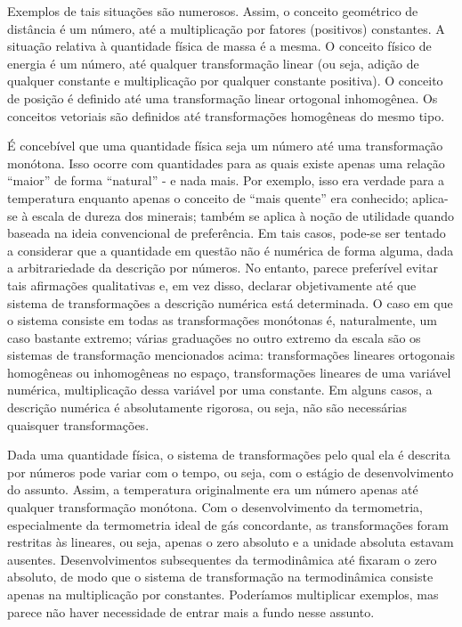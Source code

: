 \documentclass[12pt]{article}
\begin{document}
Exemplos de tais situações são numerosos. Assim, o conceito geométrico de distância é um número, até a multiplicação por fatores (positivos) constantes. A situação relativa à quantidade física de massa é a mesma. O conceito físico de energia é um número, até qualquer transformação linear (ou seja, adição de qualquer constante e multiplicação por qualquer constante positiva). O conceito de posição é definido até uma transformação linear ortogonal inhomogênea. Os conceitos vetoriais são definidos até transformações homogêneas do mesmo tipo.

É concebível que uma quantidade física seja um número até uma transformação monótona. Isso ocorre com quantidades para as quais existe apenas uma relação “maior” de forma “natural” - e nada mais. Por exemplo, isso era verdade para a temperatura enquanto apenas o conceito de “mais quente” era conhecido; aplica-se à escala de dureza dos minerais; também se aplica à noção de utilidade quando baseada na ideia convencional de preferência. Em tais casos, pode-se ser tentado a considerar que a quantidade em questão não é numérica de forma alguma, dada a arbitrariedade da descrição por números. No entanto, parece preferível evitar tais afirmações qualitativas e, em vez disso, declarar objetivamente até que sistema de transformações a descrição numérica está determinada. O caso em que o sistema consiste em todas as transformações monótonas é, naturalmente, um caso bastante extremo; várias graduações no outro extremo da escala são os sistemas de transformação mencionados acima: transformações lineares ortogonais homogêneas ou inhomogêneas no espaço, transformações lineares de uma variável numérica, multiplicação dessa variável por uma constante. Em alguns casos, a descrição numérica é absolutamente rigorosa, ou seja, não são necessárias quaisquer transformações.

Dada uma quantidade física, o sistema de transformações pelo qual ela é descrita por números pode variar com o tempo, ou seja, com o estágio de desenvolvimento do assunto. Assim, a temperatura originalmente era um número apenas até qualquer transformação monótona. Com o desenvolvimento da termometria, especialmente da termometria ideal de gás concordante, as transformações foram restritas às lineares, ou seja, apenas o zero absoluto e a unidade absoluta estavam ausentes. Desenvolvimentos subsequentes da termodinâmica até fixaram o zero absoluto, de modo que o sistema de transformação na termodinâmica consiste apenas na multiplicação por constantes. Poderíamos multiplicar exemplos, mas parece não haver necessidade de entrar mais a fundo nesse assunto.
\end{document}
